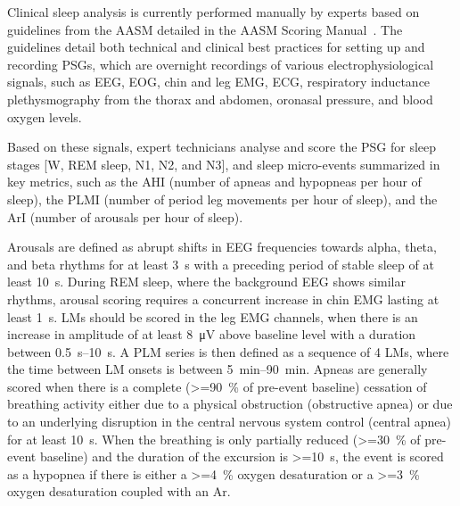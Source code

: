 Clinical sleep analysis is currently performed manually by experts based on guidelines from the \ac{AASM} detailed in the \ac{AASM} Scoring Manual~\cite{Berry2020}.
The guidelines detail both technical and clinical best practices for setting up and recording \acp{PSG}, which are overnight recordings of various electrophysiological signals, such as \ac{EEG}, \ac{EOG}, chin and leg \ac{EMG}, \ac{ECG}, respiratory inductance plethysmography from the thorax and abdomen, oronasal pressure, and blood oxygen levels.

Based on these signals, expert technicians analyse and score the \ac{PSG} for sleep stages [\ac{W}, \ac{REM} sleep, \ac{N1}, \ac{N2}, and \ac{N3}], and sleep micro-events summarized in key metrics, such as the \ac{AHI} (number of apneas and hypopneas per hour of sleep), the \ac{PLMI} (number of period leg movements per hour of sleep), and the \ac{ArI} (number of arousals per hour of sleep).

Arousals are defined as abrupt shifts in \ac{EEG} frequencies towards alpha, theta, and beta rhythms for at least \SI{3}{\second} with a preceding period of stable sleep of at least \SI{10}{\second}.
During \ac{REM} sleep, where the background \ac{EEG} shows similar rhythms, arousal scoring requires a concurrent increase in chin \ac{EMG} lasting at least \SI{1}{\second}.
\Acp{LM} should be scored in the leg \ac{EMG} channels, when there is an increase in amplitude of at least \SI{8}{\micro\volt} above baseline level with a duration between \SIrange{0.5}{10}{\second}.
A \ac{PLM} series is then defined as a sequence of 4 \acp{LM}, where the time between \ac{LM} onsets is between \SIrange{5}{90}{\minute}.
Apneas are generally scored when there is a complete (\SI{>=90}{\percent} of pre-event baseline) cessation of breathing activity either due to a physical obstruction (obstructive apnea) or due to an underlying disruption in the central nervous system control (central apnea) for at least \SI{10}{\second}.
When the breathing is only partially reduced (\SI{>=30}{\percent} of pre-event baseline) and the duration of the excursion is \SI{>=10}{\second}, the event is scored as a hypopnea if there is either a \SI{>=4}{\percent} oxygen desaturation or a \SI{>=3}{\percent} oxygen desaturation coupled with an \ac{Ar}.

